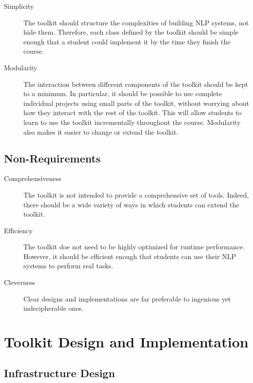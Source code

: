 \documentclass{article}
\begin{document}
\begin{description}
\item[Simplicity] The toolkit should structure the complexities of
building NLP systems, not hide them.  Therefore, each class defined by 
the toolkit should be simple enough that a student could implement it
by the time they finish the course.

\item[Modularity] The interaction between different components of the
toolkit should be kept to a minimum.  In particular, it should be
possible to use complete individual projects using small parts of the
toolkit, without worrying about how they interact with the rest of the
toolkit.  This will allow students to learn to use the toolkit
incrementally throughout the course.  Modularity also makes it easier
to change or extend the toolkit.
\end{description}

\subsection{Non-Requirements}

\begin{description}
\item[Comprehensiveness] The toolkit is not intended to provide a
comprehensive set of tools.  Indeed, there should be a wide variety of 
ways in which students can extend the toolkit.

\item[Efficiency] The toolkit doe not need to be highly optimized for
runtime performance.  However, it should be efficient enough that
students can use their NLP systems to perform real tasks.

\item[Cleverness] Clear designs and implementations are far preferable 
to ingenious yet indecipherable ones.
\end{description}

\section{Toolkit Design and Implementation}

\subsection{Infrastructure Design}
\end{document}
